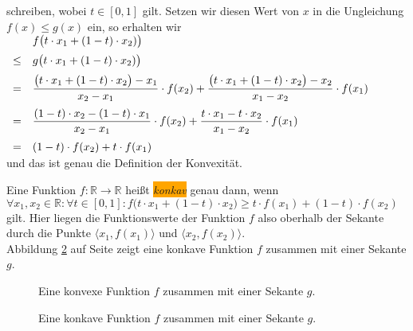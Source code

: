 \begin{Definition}
schreiben, wobei $t \in [0,1]$ gilt.  Setzen wir diesen Wert von $x$ in die Ungleichung $f(x) \leq g(x)$
ein, so erhalten wir 
\\[0.2cm]
\hspace*{1.3cm}
$
\begin{array}[t]{cl}
      &  f\bigl(t \cdot x_1 + (1-t) \cdot x_2)\bigr) \\[0.2cm]
 \leq & g\bigl(t \cdot x_1 + (1-t) \cdot x_2)\bigr)  \\[0.2cm]
  =   & \displaystyle \frac{\bigl(t \cdot x_1 + (1-t) \cdot x_2\bigr) - x_1}{x_2-x_1} \cdot f(x_2) + 
            \frac{\bigl(t \cdot x_1 + (1-t) \cdot x_2\bigr) - x_2}{x_1-x_2} \cdot f(x_1) 
        \\[0.4cm]
  =   & \displaystyle \frac{(1-t) \cdot x_2 - (1-t) \cdot x_1}{x_2-x_1} \cdot f(x_2) + 
            \frac{t \cdot x_1 - t \cdot x_2}{x_1-x_2} \cdot f(x_1) 
        \\[0.4cm]
  =   & \displaystyle (1-t) \cdot f(x_2) + t \cdot f(x_1) 
\end{array}
$
\\[0.2cm]
und das ist genau die Definition der Konvexit\"at.
\vspace*{0.2cm}

Eine Funktion $f:\mathbb{R} \rightarrow \mathbb{R}$ hei{\ss}t \colorbox{orange}{\emph{konkav}} genau dann, wenn 
\\[0.2cm]
\hspace*{1.3cm}
$\forall x_1,x_2 \in \mathbb{R}:\forall t\in [0,1]: 
  f\bigl(t \cdot x_1 + (1-t)\cdot x_2\bigr) \geq t \cdot f(x_1) + (1 - t) \cdot f(x_2)
$
\\[0.2cm]
gilt.  Hier liegen die Funktionswerte der Funktion $f$ also oberhalb 
der Sekante durch die Punkte 
$\bigl\langle x_1, f(x_1) \bigl\rangle$ und $\bigl\langle x_2, f(x_2) \bigl\rangle$.
\\[0.2cm]
Abbildung \ref{fig:concav.eps} auf Seite \pageref{fig:concav.eps} zeigt eine konkave Funktion $f$
zusammen mit einer Sekante $g$.  
\eod
\end{Definition}

\begin{figure}[!h]
  \centering
   \caption{Eine konvexe Funktion $f$ zusammen mit einer Sekante $g$.}
  \label{fig:convex.eps}
\end{figure}
\begin{figure}[!h]
  \centering
   \caption{Eine konkave Funktion $f$ zusammen mit einer Sekante $g$.}
  \label{fig:concav.eps}
\end{figure}




